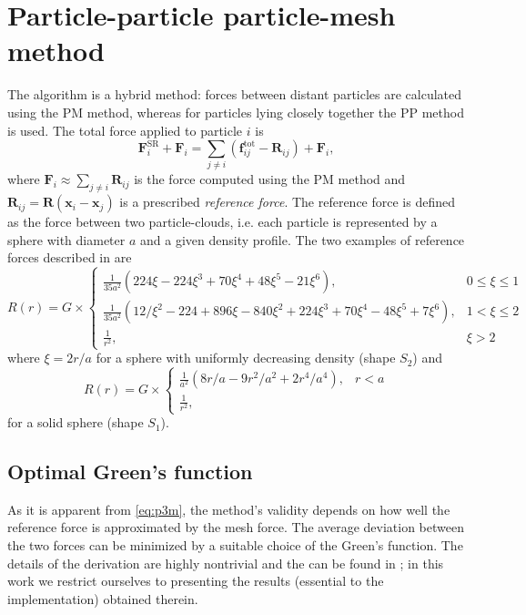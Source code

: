 \section{Particle-particle particle-mesh method}
The \PThreeM{} algorithm is a hybrid method:
forces between distant particles are calculated using the PM method, whereas for particles lying closely together the PP method is used.
The total force applied to particle $i$ is
\begin{equation}\label{eq:p3m}
    \mathbf{F}_i^\text{SR} + \mathbf{F}_i = \sum_{j \neq i}(\mathbf{f}_{ij}^\text{tot} - \mathbf{R}_{ij}) + \mathbf{F}_i,
\end{equation}
where $\mathbf{F}_i \approx \sum_{j\neq i} \mathbf{R}_{ij}$ is the force computed using the PM method and $\mathbf{R}_{ij} = \mathbf{R}(\mathbf{x}_i - \mathbf{x}_j)$ is a prescribed \textit{reference force}.
The reference force is defined as the force between two particle-clouds, i.e. each particle is represented by a sphere with diameter $a$ and a given density profile.
The two examples of reference forces described in \cite{Hockney1988} are
\begin{equation*}
    R(r) =
    G\times\begin{cases}
        \frac{1}{35  a^2}  (224  \xi - 224  \xi^3 + 70  \xi^4 + 48  \xi^5 - 21  \xi^6),                                & 0 \leq \xi \leq 1 \\
        \frac{1}{35  a^2}  (12 / \xi^2 - 224 + 896  \xi - 840  \xi^2 + 224  \xi^3 + 70  \xi^4 - 48  \xi^5 + 7  \xi^6), & 1 < \xi \leq 2    \\
        \frac{1}{r^2},                                                                                                 & \xi > 2
    \end{cases}
\end{equation*}
where $\xi = 2r/a$ for a sphere with uniformly decreasing density (shape $S_2$) and
\begin{equation*}
    R(r) =
    G\times\begin{cases}
        \frac{1}{a^2}  (8  r / a - 9  r^2 / a^2 + 2  r^4 / a^4), & r < a \\
        \frac{1}{r^2},
    \end{cases}
\end{equation*}
for a solid sphere (shape $S_1$).

\subsection{Optimal Green's function}
As it is apparent from \autoref{eq:p3m}, the method's validity depends on how well the reference force is approximated by the mesh force.
The average deviation between the two forces can be minimized by a suitable choice of the Green's function.
The details of the derivation are highly nontrivial and the can be found in \cite{Hockney1988};
in this work we restrict ourselves to presenting the results (essential to the implementation) obtained therein.

